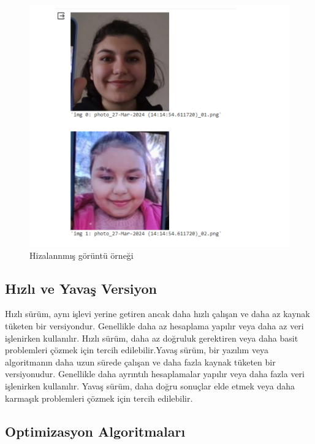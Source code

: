 \documentclass[12pt]{article}
\begin{document}
\begin{figure}[h]
\begin{minipage}{0.45\textwidth}
        \includegraphics[width=\textwidth]{aligned.png}
        \caption{Hizalannmış görüntü örneği}
        \label{fig:resim2}
    \end{minipage}
\end{figure}
\subsection{Hızlı ve Yavaş Versiyon}
Hızlı sürüm, aynı işlevi yerine getiren ancak daha hızlı çalışan ve daha az kaynak tüketen bir versiyondur. Genellikle daha az hesaplama yapılır veya daha az veri işlenirken kullanılır. Hızlı sürüm, daha az doğruluk gerektiren veya daha basit problemleri çözmek için tercih edilebilir.Yavaş sürüm, bir yazılım veya algoritmanın daha uzun sürede çalışan ve daha fazla kaynak tüketen bir versiyonudur. Genellikle daha ayrıntılı hesaplamalar yapılır veya daha fazla veri işlenirken kullanılır. Yavaş sürüm, daha doğru sonuçlar elde etmek veya daha karmaşık problemleri çözmek için tercih edilebilir.
\subsection{Optimizasyon Algoritmaları}
\end{document}
